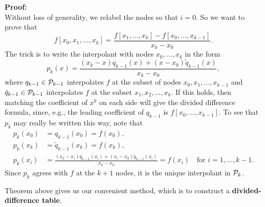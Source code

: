 \documentclass[
  letterpaper,
  DIV=11,
  numbers=noendperiod]{scrreprt}
\begin{document}
\textbf{Proof:}\\
Without loss of generality, we relabel the nodes so that \(i=0\). So we
want to prove that \[
f[x_0,x_1,\ldots,x_{k}] = \frac{f[x_1,\ldots,x_{k}] - f[x_0,\ldots,x_{k-1}]}{x_{k} - x_0}.
\] The trick is to write the interpolant with nodes \(x_0, \ldots, x_k\)
in the form \[
p_k(x) = \frac{(x_k-x)q_{k-1}(x) + (x-x_0)\tilde{q}_{k-1}(x)}{x_k-x_0},
\] where \(q_{k-1}\in{\cal P}_{k-1}\) interpolates \(f\) at the subset
of nodes \(x_0, x_1, \ldots, x_{k-1}\) and
\(\tilde{q}_{k-1}\in{\cal P}_{k-1}\) interpolates \(f\) at the subset
\(x_1, x_2,\ldots,x_k\). If this holds, then matching the coefficient of
\(x^k\) on each side will give the divided difference formula, since,
e.g., the leading coefficient of \(q_{k-1}\) is
\(f[x_0,\ldots,x_{k-1}]\). To see that \(p_k\) may really be written
this way, note that \[
\begin{aligned}
p_k(x_0) &= q_{k-1}(x_0) = f(x_0),\\
p_k(x_k) &= \tilde{q}_{k-1}(x_k) = f(x_k),\\
p_k(x_i) &= \frac{(x_k-x_i)q_{k-1}(x_i) + (x_i-x_0)\tilde{q}_{k-1}(x_i)}{x_k - x_0} = f(x_i) \quad \textrm{for $i=1,\ldots,k-1$}.
\end{aligned}
\] Since \(p_k\) agrees with \(f\) at the \(k+1\) nodes, it is the
unique interpolant in \({\cal P}_k\).

Theorem above gives us our convenient method, which is to construct a
\textbf{divided-difference table}.
\end{document}
